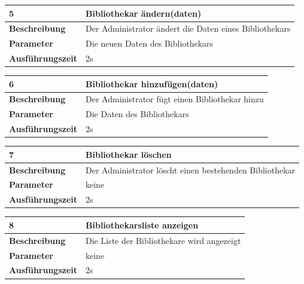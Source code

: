 \documentclass[fontsize=12pt,paper=a4,twoside]{scrartcl}
\begin{document}
\begin{table}
	[H] \label{a5} 
	\begin{tabular}
		{|l|p{10cm}|} \hline \textbf{5} & \textbf{Bibliothekar ändern(daten)} \\
		\hline \textbf{Beschreibung} & Der Administrator ändert die Daten eines Bibliothekars\\
		\hline \textbf{Parameter} & Die neuen Daten des Bibliothekars \\
		\hline \textbf{Ausführungszeit} & 2s\\
		\hline 
	\end{tabular}
\end{table}
\begin{table}
	[H] \label{a6} 
	\begin{tabular}
		{|l|p{10cm}|} \hline \textbf{6} & \textbf{Bibliothekar hinzufügen(daten)} \\
		\hline \textbf{Beschreibung} & Der Administrator fügt einen Bibliothekar hinzu\\
		\hline \textbf{Parameter} & Die Daten des Bibliothekars \\
		\hline \textbf{Ausführungszeit} & 2s\\
		\hline 
	\end{tabular}
\end{table}
\begin{table}
	[H] \label{a7} 
	\begin{tabular}
		{|l|p{10cm}|} \hline \textbf{7} & \textbf{Bibliothekar löschen} \\
		\hline \textbf{Beschreibung} & Der Administrator löscht einen bestehenden Bibliothekar\\
		\hline \textbf{Parameter} & keine \\
		\hline \textbf{Ausführungszeit} & 2s\\
		\hline 
	\end{tabular}
\end{table}
\begin{table}
	[H] \label{a8} 
	\begin{tabular}
		{|l|p{10cm}|} \hline \textbf{8} & \textbf{Bibliothekarsliste anzeigen} \\
		\hline \textbf{Beschreibung} & Die Liste der Bibliothekare wird angezeigt\\
		\hline \textbf{Parameter} & keine \\
		\hline \textbf{Ausführungszeit} & 2s\\
		\hline 
	\end{tabular}
\end{table}
\end{document}
